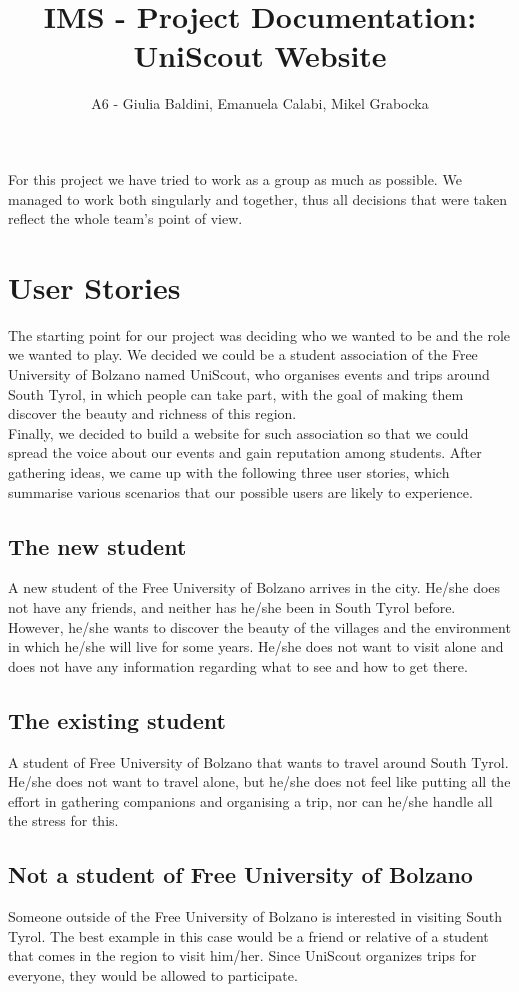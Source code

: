\documentclass[a4paper]{article}
\title{IMS - Project Documentation: UniScout Website}
\author{A6 - Giulia Baldini, Emanuela Calabi, Mikel Grabocka}
\begin{document}
	\maketitle
	
	\noindent For this project we have tried to work as a group as much as possible. We managed to work both singularly and together, thus all decisions that were taken reflect the whole team's point of view.
	
	\section{User Stories}
	The starting point for our project was deciding who we wanted to be and the role we wanted to play. We decided we could be a student association of the Free University of Bolzano named UniScout, who organises events and trips around South Tyrol, in which people can take part, with the goal of making them discover the beauty and richness of this region.\\
	Finally, we decided to build a website for such association so that we could spread the voice about our events and gain reputation among students. After gathering ideas, we came up with the following three user stories, which summarise various scenarios that our possible users are likely to experience.
	
	\subsection{The new student}
	A new student of the Free University of Bolzano arrives in the city. He/she does not have any friends, and neither has he/she been in South Tyrol before. However, he/she wants to discover the beauty of the villages and the environment in which he/she will live for some years. He/she does not want to visit alone and does not have any information regarding what to see and how to get there.
	
	\subsection{The existing student }
	A student of Free University of Bolzano that wants to travel around South Tyrol. He/she does not want to travel alone, but he/she does not feel like putting all the effort in gathering companions and organising a trip, nor can he/she handle all the stress for this.
	
	\subsection{Not a student of Free University of Bolzano}
	Someone outside of the Free University of Bolzano is interested in visiting South Tyrol. The best example in this case would be a friend or relative of a student that comes in the region to visit him/her. Since UniScout organizes trips for everyone, they would be allowed to participate.
	
\end{document}
